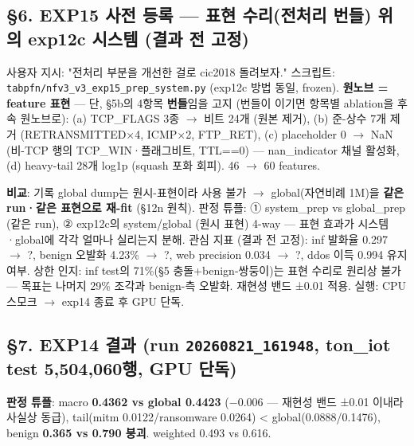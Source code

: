 \subsection{§6. EXP15 사전 등록 — 표현 수리(전처리 번들) 위의 exp12c 시스템 (결과 전 고정)}
사용자 지시: "전처리 부분을 개선한 걸로 cic2018 돌려보자." 스크립트: \texttt{tabpfn/\allowbreak{}\allowbreak{}n\allowbreak{}fv3\_\allowbreak{}\allowbreak{}v3\_\allowbreak{}\allowbreak{}e\allowbreak{}xp15\_\allowbreak{}\allowbreak{}pre\allowbreak{}p\_\allowbreak{}\allowbreak{}system\allowbreak{}.\allowbreak{}py} (exp12c 방법 동일, frozen). \textbf{원노브 =\allowbreak{} feature 표현} — 단, §5b의 4항목 \textbf{번들}임을 고지 (번들이 이기면 항목별 ablation을 후속 원노브로): (a) TCP\_\allowbreak{}FLAGS 3종  \ensuremath{\rightarrow}  비트 24개 (원본 제거), (b) 준-상수 7개 제거 (RETRANSMITTED×4, ICMP×2, FTP\_\allowbreak{}RET), (c) placeholder 0 \ensuremath{\rightarrow} NaN (비-TCP 행의 TCP\_\allowbreak{}WIN·플래그비트, TTL=\allowbreak{}=\allowbreak{}0) — nan\_\allowbreak{}indicator 채널 활성화, (d) heavy-tail 28개 log1p (squash 포화 회피). 46  \ensuremath{\rightarrow}  60 features.

\textbf{비교}: 기록 global dump는 원시-표현이라 사용 불가  \ensuremath{\rightarrow}  global(자연비례 1M)을 \textbf{같은 run·같은 표현으로 재-fit} (§12n 원칙). 판정 튜플: ① system\_\allowbreak{}prep vs global\_\allowbreak{}prep (같은 run), ② exp12c의 system/\allowbreak{}global (원시 표현) 4-way — 표현 효과가 시스템·global에 각각 얼마나 실리는지 분해. 관심 지표 (결과 전 고정): inf 발화율 0.297 \ensuremath{\rightarrow} ?, benign 오발화 4.23\% \ensuremath{\rightarrow} ?, web precision 0.034 \ensuremath{\rightarrow} ?, ddos 이득 0.994 유지 여부. 상한 인지: inf test의 71\%(§5 충돌+\allowbreak{}benign-쌍둥이)는 표현 수리로 원리상 불가 — 목표는 나머지 29\% 조각과 benign-측 오발화. 재현성 밴드 ±0.01 적용. 실행: CPU 스모크  \ensuremath{\rightarrow}  exp14 종료 후 GPU 단독.

\subsection{§7. EXP14 결과 (run \texttt{20260821\allowbreak{}\_\allowbreak{}\allowbreak{}161948}, ton\_\allowbreak{}iot test 5,504,060행, GPU 단독)}
\textbf{판정 튜플}: macro \textbf{0.4362 vs global 0.4423} (−0.006 — 재현성 밴드 ±0.01 이내라 사실상 동급), tail(mitm 0.0122/\allowbreak{}ransomware 0.0264) < global(0.0888/\allowbreak{}0.1476), benign \textbf{0.365 vs 0.790 붕괴}. weighted 0.493 vs 0.616.

